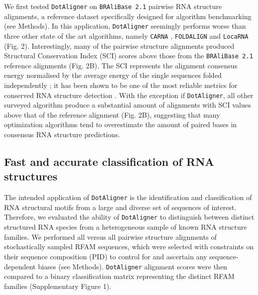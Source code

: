 \documentclass{bmcart}
\newcommand\dotaligner{\texttt{DotAligner}}
\newcommand\bralibase{\texttt{BRAliBase 2.1}}
\newcommand\locarna{\texttt{LocaRNA}}
\newcommand\foldalign{\texttt{FOLDALIGN}}
\newcommand\carna{\texttt{CARNA}}
\begin{document}
We first tested \dotaligner{} on \bralibase{} pairwise RNA structure alignments, a reference 
dataset specifically designed for algorithm benchmarking 
\cite{Gardner15860779,wilm2006enhanced} (see Methods). In this application, \dotaligner{} seemingly  
performs worse than three other state of the art algorithms, namely \carna{} \cite{Sorescu2012}, \foldalign{} \cite{havgaard2007fast,sundfeld2015foldalign} and \locarna{} \cite{Will17432929}
(Fig. 2). Interestingly, many of the pairwise structure alignments produced Structural 
Conservation Index (SCI) scores above those from the \bralibase{} reference alignments 
(Fig. 2B). The SCI represents the alignment consensus energy normalised
 by the average energy of the single sequences folded independently \cite{washietl2005fast}; 
it has been shown to be one of the most reliable metrics for conserved RNA structure 
detection \cite{gruber2008strategies}. With the exception if \dotaligner{}, all other 
surveyed algorithm produce a substantial amount of alignments with SCI values 
above that of the reference  alignment (Fig. 2B), suggesting that many optimization 
algorithms tend to overestimate the amount of paired bases in consensus RNA structure predictions. \\

\subsection*{Fast and accurate classification of RNA structures} 

The intended application of \dotaligner{}  is the identification and
classification of RNA structural motifs from a large and diverse set of sequences of interest. 
Therefore, we evaluated the ability of \dotaligner{} to distinguish between distinct structured 
RNA species from a heterogeneous sample of known RNA structure families. 
We performed all versus all pairwise structure alignments of stochastically sampled RFAM sequences, 
which were selected with constraints on their sequence composition (PID) to 
control for and ascertain any sequence-dependent biases (see Methods). 
\dotaligner{} alignment scores were then compared to a binary classification matrix 
representing the distinct RFAM families (Supplementary Figure 1).\\
\end{document}
